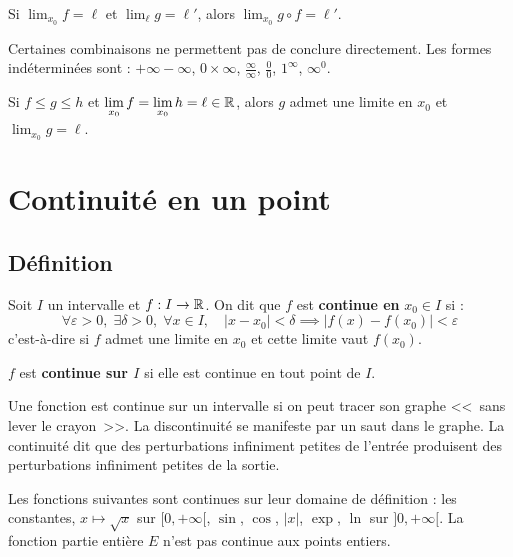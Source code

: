 \begin{propbox}
Si $\displaystyle\lim_{x_0} f = \ell$ et $\displaystyle\lim_{\ell} g = \ell'$, alors $\displaystyle\lim_{x_0} g \circ f = \ell'$.
\end{propbox}

\begin{rembox}
Certaines combinaisons ne permettent pas de conclure directement. Les formes indéterminées sont : $+\infty - \infty$, $0 \times \infty$, $\frac{\infty}{\infty}$, $\frac{0}{0}$, $1^{\infty}$, $\infty^0$.
\end{rembox}

\begin{thmbox}
Si $f \leqslant g \leqslant h$ et $\displaystyle\lim_{x_0} f = \lim_{x_0} h = \ell \in \mathbb{R}$, alors $g$ admet une limite en $x_0$ et $\displaystyle\lim_{x_0} g = \ell$.
\end{thmbox}


\section{Continuité en un point}

\subsection{Définition}

\begin{defbox}
Soit $I$ un intervalle et $f : I \to \mathbb{R}$. On dit que $f$ est \textbf{continue en} $x_0 \in I$ si :
\[\forall \varepsilon > 0, \; \exists \delta > 0, \; \forall x \in I, \quad |x - x_0| < \delta \implies |f(x) - f(x_0)| < \varepsilon\]
c'est-à-dire si $f$ admet une limite en $x_0$ et cette limite vaut $f(x_0)$.

$f$ est \textbf{continue sur $I$} si elle est continue en tout point de $I$.
\end{defbox}

\begin{intuitionbox}
Une fonction est continue sur un intervalle si on peut tracer son graphe <<~sans lever le crayon~>>. La discontinuité se manifeste par un saut dans le graphe. La continuité dit que des perturbations infiniment petites de l'entrée produisent des perturbations infiniment petites de la sortie.
\end{intuitionbox}

\begin{exbox}
Les fonctions suivantes sont continues sur leur domaine de définition : les constantes, $x \mapsto \sqrt{x}$ sur $[0, +\infty[$, $\sin$, $\cos$, $|x|$, $\exp$, $\ln$ sur $]0, +\infty[$. La fonction partie entière $E$ n'est pas continue aux points entiers.
\end{exbox}

